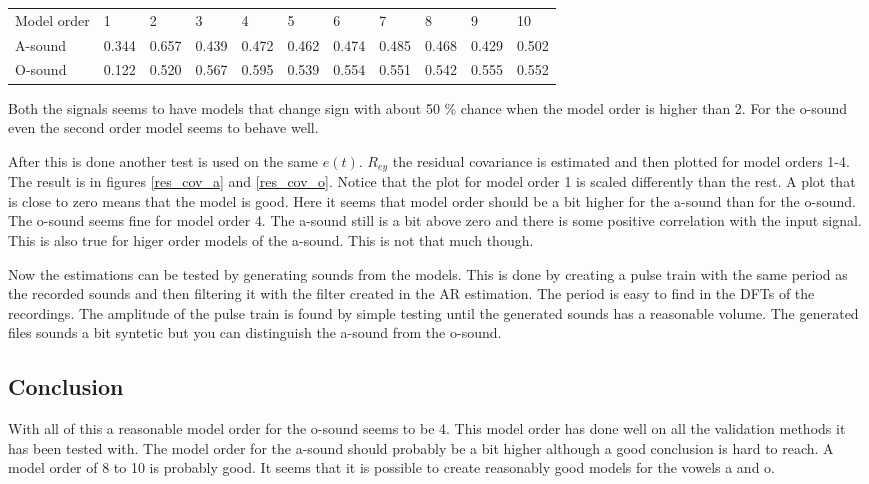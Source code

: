 \documentclass[12pt]{article}
\begin{document}
\begin{tabular}{l|l|l|l|l|l|l|l|l|l|l}
  \hline
  Model order & 1 & 2 & 3 & 4 & 5 & 6 & 7 & 8 & 9 & 10 \\
  A-sound & 0.344 & 0.657 & 0.439 & 0.472 & 0.462 & 0.474 & 0.485 & 0.468 & 0.429 & 0.502 \\
  O-sound & 0.122 & 0.520 & 0.567 & 0.595 & 0.539 & 0.554 & 0.551 & 0.542 & 0.555 & 0.552 \\
\end{tabular}

Both the signals seems to have models that change sign with about 50 \% chance when the model order is higher than 2.
For the o-sound even the second order model seems to behave well.

After this is done another test is used on the same $e(t)$.
$R_{ey}$ the residual covariance is estimated and then plotted for model orders 1-4.
The result is in figures \ref{res_cov_a} and \ref{res_cov_o}.
Notice that the plot for model order 1 is scaled differently than the rest.
A plot that is close to zero means that the model is good.
Here it seems that model order should be a bit higher for the a-sound than for the o-sound.
The o-sound seems fine for model order 4.
The a-sound still is a bit above zero and there is some positive correlation with the input signal.
This is also true for higer order models of the a-sound.
This is not that much though.

Now the estimations can be tested by generating sounds from the models.
This is done by creating a pulse train with the same period as the recorded sounds and then filtering it with the filter created in the AR estimation.
The period is easy to find in the DFTs of the recordings.
The amplitude of the pulse train is found by simple testing until the generated sounds has a reasonable volume.
The generated files sounds a bit syntetic but you can distinguish the a-sound from the o-sound.

\subsection{Conclusion}

With all of this a reasonable model order for the o-sound seems to be 4.
This model order has done well on all the validation methods it has been tested with.
The model order for the a-sound should probably be a bit higher although a good conclusion is hard to reach.
A model order of 8 to 10 is probably good.
It seems that it is possible to create reasonably good models for the vowels a and o.
\end{document}
